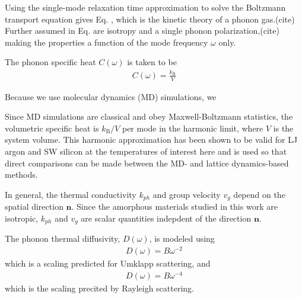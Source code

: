 \documentclass[aps,prb,twocolumn,superscriptaddress,footinbib,amsmath,amssymb,floatfix]{revtex4}
\begin{document}
Using the single-mode relaxation
time approximation \cite{ziman_electrons_2001} to solve 
the Boltzmann transport equation gives Eq. , which is the 
kinetic theory of a phonon gas.(cite) Further assumed in Eq. 
are isotropy and a single phonon 
polarization,(cite) making the  
properties a function of the mode frequency $\omega$ only. 

The phonon specific heat $C(\omega)$ is taken to be 
\begin{equation}\label{EQ:Cw}
\begin{split}
C(\omega) = \frac{k_{\text{B}}}{V}  
\end{split}
\end{equation}

Because we use molecular dynamics (MD) simulations, we

Since MD simulations are classical 
and obey Maxwell-Boltzmann 
statistics,\cite{mcquarrie_statistical_2000} the volumetric 
specific heat is $k_{\text{B}}/V$ per mode in the harmonic limit, where $V$ 
is the system volume. This harmonic approximation has been shown to be valid 
for LJ argon and SW silicon at the temperatures of interest here
\cite{mcgaughey_quantitative_2004,goicochea_thermal_2010} 
and is used so that direct comparisons can be made between 
the MD- and lattice dynamics-based methods.

In general, the thermal conductivity $k_{ph}$ and group velocity 
$v_{g}$ depend on the spatial direction $\mathbf{n}$. 
Since the amorphous materials studied in this work are isotropic, 
$k_{ph}$ and $v_{g}$ are scalar quantities indepdent of the direction 
$\mathbf{n}$. 

The phonon thermal diffusivity, $D(\omega)$, is modeled using 
\begin{equation}\label{EQ:Dw2}
\begin{split}
D(\omega) = B\omega^{-2} 
\end{split}
\end{equation}
which is a scaling predicted for Umklapp scattering, and
\begin{equation}\label{EQ:Dw4}
\begin{split}
D(\omega) = B\omega^{-4} 
\end{split}
\end{equation}
which is the scaling precited by Rayleigh scattering. 
\end{document}
